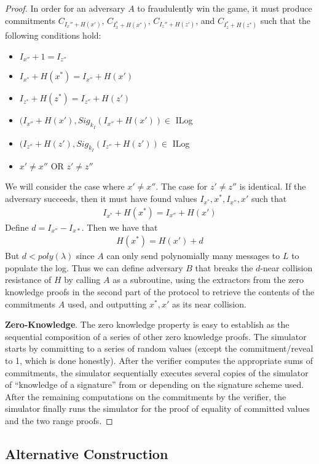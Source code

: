 \documentclass[letterpaper,twocolumn,10pt]{article}
\begin{document}
\begin{proof}
In order for an adversary $A$ to fraudulently win the game, it must produce commitments $C_{I_x''+H(x')}$, $C_{I_x^*+H(x^*)}$, $C_{I_z''+H(z')}$, and $C_{I_z^*+H(z^*)}$ such that the following conditions hold:
\begin{itemize}
\item $I_{x''}+1=I_{z''}$
\item $I_{x^*}+H(x^*)=I_{x''}+H(x')$
\item $I_{z^*}+H(z^*)=I_{z''}+H(z')$
\item $(I_{x''}+H(x'), Sig_{k_I}(I_{x''}+H(x'))\in$ ILog
\item $(I_{z''}+H(z'), Sig_{k_I}(I_{z''}+H(z'))\in$ ILog
\item $x'\neq x''$ OR $z'\neq z''$
\end{itemize}
We will consider the case where $x'\neq x''$. The case for $z'\neq z''$ is identical. If the adversary succeeds, then it must have found values $I_{x^*}, x^*, I_{x''}, x'$ such that 
\begin{align}I_{x^*}+H(x^*)=I_{x''}+H(x')\end{align}
Define $d=I_{x''}-I_{x*}$. Then we have that 
\begin{align}H(x^*)=H(x')+d \end{align} 
But $d < poly(\lambda)$ since $A$ can only send polynomially many messages to $L$ to populate the log. Thus we can define adversary $B$ that breaks the $d$-near collision resistance of $H$ by calling $A$ as a subroutine, using the extractors from the zero knowledge proofs in the second part of the protocol to retrieve the contents of the commitments $A$ used, and outputting $x^*, x'$ as its near collision. 

\textbf{Zero-Knowledge}. The zero knowledge property is easy to establish as the sequential composition of a series of other zero knowledge proofs. The simulator starts by committing to a series of random values (except the commitment/reveal to 1, which is done honestly). After the verifier computes the appropriate sums of commitments, the simulator sequentially executes several copies of the simulator of ``knowledge of a signature'' from \cite{CL04} or \cite{CL02} depending on the signature scheme used. After the remaining computations on the commitments by the verifier, the simulator finally runs the simulator for the proof of equality of committed values and the two range proofs.
\end{proof}

\subsection{Alternative Construction}
\end{document}
